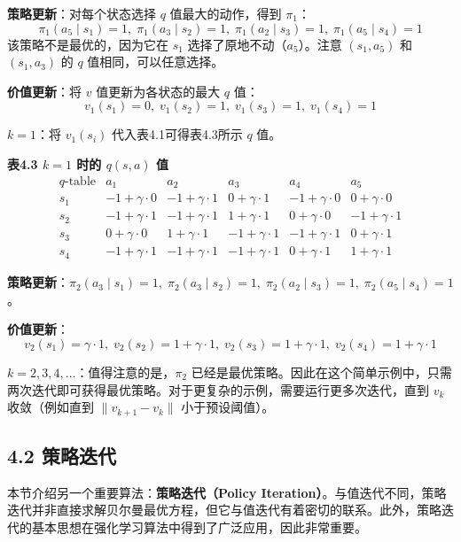 \documentclass[UTF8]{article}
\begin{document}
\textbf{策略更新}：对每个状态选择 $q$ 值最大的动作，得到 $\pi_1$：
\[
\pi_1(a_5 \mid s_1) = 1,\; \pi_1(a_3 \mid s_2) = 1,\; \pi_1(a_2 \mid s_3) = 1,\; \pi_1(a_5 \mid s_4) = 1
\]
该策略不是最优的，因为它在 $s_1$ 选择了原地不动（$a_5$）。注意 $(s_1, a_5)$ 和 $(s_1, a_3)$ 的 $q$ 值相同，可以任意选择。

\textbf{价值更新}：将 $v$ 值更新为各状态的最大 $q$ 值：
\[
v_1(s_1) = 0,\; v_1(s_2) = 1,\; v_1(s_3) = 1,\; v_1(s_4) = 1
\]

\textbf{$k = 1$}：将 $v_1(s_i)$ 代入表4.1可得表4.3所示 $q$ 值。

\begin{center}
\textbf{表4.3 $k=1$ 时的 $q(s,a)$ 值}
\[
\begin{array}{c|ccccc}
q\text{-table} & a_1 & a_2 & a_3 & a_4 & a_5 \\
\hline
s_1 & -1 + \gamma \cdot 0 & -1 + \gamma \cdot 1 & 0 + \gamma \cdot 1 & -1 + \gamma \cdot 0 & 0 + \gamma \cdot 0 \\
s_2 & -1 + \gamma \cdot 1 & -1 + \gamma \cdot 1 & 1 + \gamma \cdot 1 & 0 + \gamma \cdot 0 & -1 + \gamma \cdot 1 \\
s_3 & 0 + \gamma \cdot 0 & 1 + \gamma \cdot 1 & -1 + \gamma \cdot 1 & -1 + \gamma \cdot 1 & 0 + \gamma \cdot 1 \\
s_4 & -1 + \gamma \cdot 1 & -1 + \gamma \cdot 1 & -1 + \gamma \cdot 1 & 0 + \gamma \cdot 1 & 1 + \gamma \cdot 1
\end{array}
\]
\end{center}

\textbf{策略更新}：$\pi_2(a_3 \mid s_1) = 1,\; \pi_2(a_3 \mid s_2) = 1,\; \pi_2(a_2 \mid s_3) = 1,\; \pi_2(a_5 \mid s_4) = 1$。

\textbf{价值更新}：
\[
v_2(s_1) = \gamma \cdot 1,\; v_2(s_2) = 1 + \gamma \cdot 1,\; v_2(s_3) = 1 + \gamma \cdot 1,\; v_2(s_4) = 1 + \gamma \cdot 1
\]

\textbf{$k = 2, 3, 4, \dots$}：值得注意的是，$\pi_2$ 已经是最优策略。因此在这个简单示例中，只需两次迭代即可获得最优策略。对于更复杂的示例，需要运行更多次迭代，直到 $v_k$ 收敛（例如直到 $\|v_{k+1} - v_k\|$ 小于预设阈值）。

\subsection*{4.2 策略迭代}

本节介绍另一个重要算法：\textbf{策略迭代（Policy Iteration）}。与值迭代不同，策略迭代并非直接求解贝尔曼最优方程，但它与值迭代有着密切的联系。此外，策略迭代的基本思想在强化学习算法中得到了广泛应用，因此非常重要。
\end{document}
